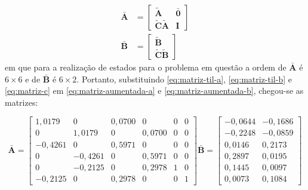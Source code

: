 \begin{subequations}
    \begin{align}
        \mathbf{\bar{A}} &=
        \begin{bmatrix}
            \label{eq:matriz-aumentada-a}
            \mathbf{\tilde{A}} & \mathbf{\bar{0}}\\ 
            \mathbf{\tilde{C}}\mathbf{\tilde{A}} & \mathbf{I}
        \end{bmatrix}   \\
        \mathbf{\bar{B}} &=
        \begin{bmatrix}
            \label{eq:matriz-aumentada-b}
            \mathbf{\tilde{B}}\\ 
            \mathbf{\tilde{C}}\mathbf{\tilde{B}}
        \end{bmatrix}
    \end{align}
\end{subequations} em que para a realização de estados para o problema em
questão a ordem de $\mathbf{\bar{A}}$ é $6 \times 6$ e de $\mathbf{\bar{B}}$ é
$6 \times 2$. Portanto, substituindo \ref{eq:matriz-til-a},
\ref{eq:matriz-til-b} e \ref{eq:matriz-c} em \ref{eq:matriz-aumentada-a} e
\ref{eq:matriz-aumentada-b}, chegou-se as matrizes:

\begin{subequations}
        \begin{equation}
            \label{eq:matriz-aumentanda-a-com-valores}
            \mathbf{\bar{A}} =
            \begin{bmatrix}
                1,0179  &  0       &  0,0700  &  0       & 0       & 0      \\
                0       &  1,0179  &  0       &  0,0700  & 0       & 0      \\
                -0,4261 &  0       &  0,5971  &  0       & 0       & 0      \\
                0       &  -0,4261 &  0       &  0,5971  & 0       & 0      \\
                0       &  -0,2125 &  0       &  0,2978  & 1       & 0      \\
                -0,2125 &  0       &  0,2978  &  0       & 0       & 1
            \end{bmatrix}
        \end{equation}    
        \begin{equation}
            \label{eq:matriz-aumentanda-b-com-valores}
            \mathbf{\bar{B}} =
            \begin{bmatrix}
                -0,0644 & -0,1686 \\
                -0,2248 & -0,0859 \\
                0,0146 &  0,2173  \\
                0,2897 &  0,0195  \\
                0,1445 &  0,0097  \\
                0,0073 &  0,1084
            \end{bmatrix}
        \end{equation}
\end{subequations}

